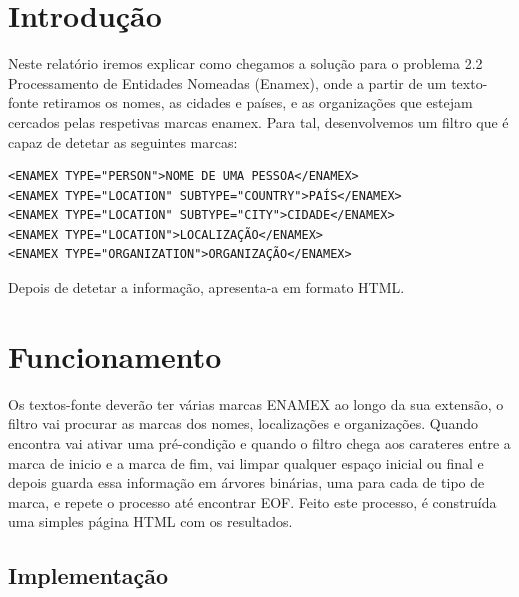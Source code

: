 \documentclass[11pt,a4paper]{article}
\begin{document}
\begin{titlepage}

 


\end{titlepage}



\section{Introdução}

Neste relatório iremos explicar como chegamos a solução para o problema 2.2 Processamento de Entidades Nomeadas (Enamex), onde a partir de um texto-fonte retiramos os nomes, as cidades e países, e as organizações que estejam cercados pelas respetivas marcas enamex. 
Para tal, desenvolvemos um filtro que é capaz de detetar as seguintes marcas:
\begin{verbatim}
<ENAMEX TYPE="PERSON">NOME DE UMA PESSOA</ENAMEX>
<ENAMEX TYPE="LOCATION" SUBTYPE="COUNTRY">PAÍS</ENAMEX>
<ENAMEX TYPE="LOCATION" SUBTYPE="CITY">CIDADE</ENAMEX>
<ENAMEX TYPE="LOCATION">LOCALIZAÇÃO</ENAMEX>
<ENAMEX TYPE="ORGANIZATION">ORGANIZAÇÃO</ENAMEX>
\end{verbatim}
Depois de detetar a informação, apresenta-a em formato HTML.


\section{Funcionamento}

Os textos-fonte deverão ter várias marcas ENAMEX ao longo da sua extensão, o filtro vai procurar as marcas dos nomes, localizações e organizações. Quando encontra vai ativar uma pré-condição e quando o filtro chega aos carateres entre a marca de inicio e a marca de fim, vai limpar qualquer espaço inicial ou final e depois guarda essa informação em árvores binárias, uma para cada de tipo de marca, e repete o processo até encontrar EOF. Feito este processo, é construída uma simples página HTML com os resultados.

\subsection{Implementação}
\end{document}
